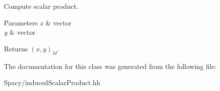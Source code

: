 Compute scalar product. 


\begin{DoxyParams}{Parameters}
{\em x} & vector \\
\hline
{\em y} & vector \\
\hline
\end{DoxyParams}
\begin{DoxyReturn}{Returns}
$(x,y)_M$. 
\end{DoxyReturn}


The documentation for this class was generated from the following file\+:\begin{DoxyCompactItemize}
\item 
Spacy/induced\+Scalar\+Product.\+hh\end{DoxyCompactItemize}
